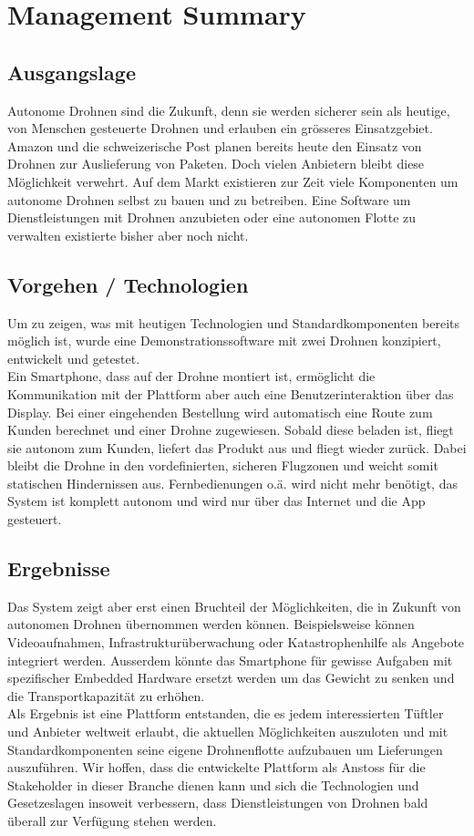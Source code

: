 \newpage
{}
\chapter*{Management Summary}
\section*{Ausgangslage}
Autonome Drohnen sind die Zukunft, denn sie werden sicherer sein als heutige, von Menschen gesteuerte Drohnen und erlauben ein grösseres Einsatzgebiet. Amazon und die schweizerische Post planen bereits heute den Einsatz von Drohnen zur Auslieferung von Paketen. Doch vielen Anbietern bleibt diese Möglichkeit verwehrt. Auf dem Markt existieren zur Zeit viele Komponenten um autonome Drohnen selbst zu bauen und zu betreiben. Eine Software um Dienstleistungen mit Drohnen anzubieten oder eine autonomen Flotte zu verwalten existierte bisher aber noch nicht.

\section*{Vorgehen / Technologien}
Um zu zeigen, was mit heutigen Technologien und Standardkomponenten bereits möglich ist, wurde eine Demonstrationssoftware mit zwei Drohnen konzipiert, entwickelt und getestet. \\

Ein Smartphone, dass auf der Drohne montiert ist, ermöglicht die Kommunikation mit der Plattform aber auch eine Benutzerinteraktion über das Display. Bei einer eingehenden Bestellung wird automatisch eine Route zum Kunden berechnet und einer Drohne zugewiesen. Sobald diese beladen ist, fliegt sie autonom zum Kunden, liefert das Produkt aus und fliegt wieder zurück. Dabei bleibt die Drohne in den vordefinierten, sicheren Flugzonen und weicht somit statischen Hindernissen aus. Fernbedienungen o.ä. wird nicht mehr benötigt, das System ist komplett autonom und wird nur über das Internet und die App gesteuert.

\section*{Ergebnisse}
Das System zeigt aber erst einen Bruchteil der Möglichkeiten, die in Zukunft von autonomen Drohnen übernommen werden können. Beispielsweise können Videoaufnahmen, Infrastrukturüberwachung oder Katastrophenhilfe als Angebote integriert werden. Ausserdem könnte das Smartphone für gewisse Aufgaben mit spezifischer Embedded Hardware ersetzt werden um das Gewicht zu senken und die Transportkapazität zu erhöhen. \\

Als Ergebnis ist eine Plattform entstanden, die es jedem interessierten Tüftler und Anbieter weltweit erlaubt, die aktuellen Möglichkeiten auszuloten und mit Standardkomponenten seine eigene Drohnenflotte aufzubauen um Lieferungen auszuführen. Wir hoffen, dass die entwickelte Plattform als Anstoss für die Stakeholder in dieser Branche dienen kann und sich die Technologien und Gesetzeslagen insoweit verbessern, dass Dienstleistungen von Drohnen bald überall zur Verfügung stehen werden.